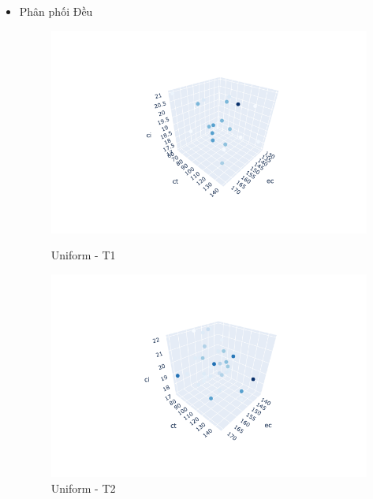 \documentclass{hust}
\begin{document}
\begin{itemize}
	\item Phân phối Đều
	\begin{figure}[H]
		\begin{minipage}{0.5\textwidth}
			\centering
			\includegraphics[width=1.2\linewidth]{images/uu-dem1.png}
			\caption{Uniform - T1}\label{fig:nsga-ii-uu-dem1}
		\end{minipage}\hfill
		\begin{minipage}{0.5\textwidth}
			\centering
			\includegraphics[width=1.2\linewidth]{images/uu-dem2.png}
			\caption{Uniform - T2}\label{fig:nsga-ii-uu-dem2}
		\end{minipage}
	\end{figure}
	

\end{itemize}
\end{document}
